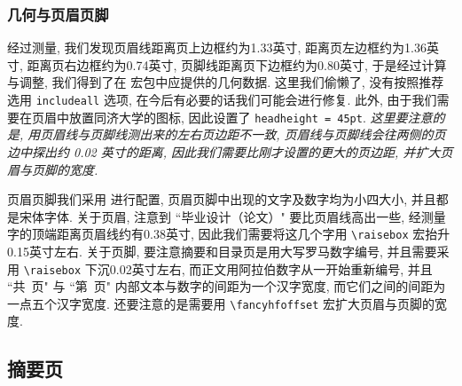 \subsubsection{几何与页眉页脚}

经过测量, 我们发现页眉线距离页上边框约为1.33英寸, 距离页左边框约为1.36英寸, 距离页右边框约为0.74英寸, 页脚线距离页下边框约为0.80英寸, 于是经过计算与调整, 我们得到了在  宏包中应提供的几何数据. 这里我们偷懒了, 没有按照推荐选用 \verb|includeall| 选项, 在今后有必要的话我们可能会进行修复. 此外, 由于我们需要在页眉中放置同济大学的图标, 因此设置了 \verb|headheight = 45pt|. \emph{这里要注意的是, 用页眉线与页脚线测出来的左右页边距不一致, 页眉线与页脚线会往两侧的页边中探出约 0.02 英寸的距离, 因此我们需要比刚才设置的更大的页边距, 并扩大页眉与页脚的宽度.}

页眉页脚我们采用  进行配置, 页眉页脚中出现的文字及数字均为小四大小, 并且都是宋体字体. 关于页眉, 注意到 ``毕业设计（论文）" 要比页眉线高出一些, 经测量字的顶端距离页眉线约有0.38英寸, 因此我们需要将这几个字用 \verb|\raisebox| 宏抬升0.15英寸左右. 关于页脚, 要注意摘要和目录页是用大写罗马数字编号, 并且需要采用 \verb|\raisebox| 下沉0.02英寸左右, 而正文用阿拉伯数字从一开始重新编号, 并且 ``共\ 页" 与 ``第\ 页" 内部文本与数字的间距为一个汉字宽度, 而它们之间的间距为一点五个汉字宽度. 还要注意的是需要用 \verb|\fancyhfoffset| 宏扩大页眉与页脚的宽度.

\subsection{摘要页}

